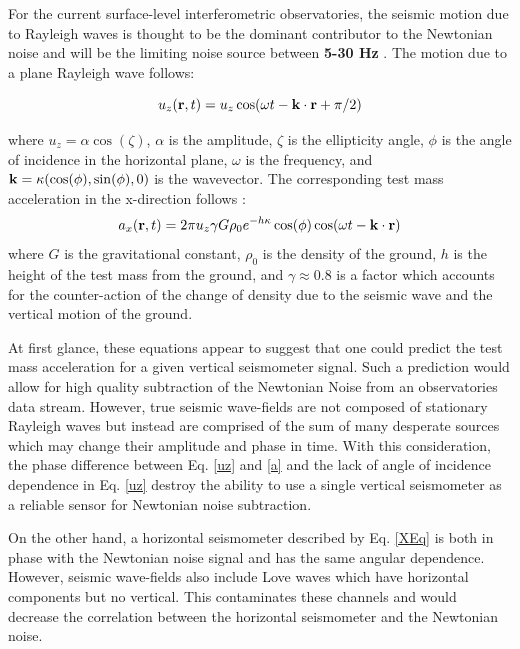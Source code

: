 \documentclass [12pt, proquest]{uwthesis}[2019]
\begin{document}
For the current surface-level interferometric observatories, the seismic motion due to Rayleigh waves is thought to be the dominant contributor to the Newtonian noise and will be the limiting noise source between \textbf{5-30 Hz} \cite{}. The motion due to a plane Rayleigh wave follows:

\begin{equation}
u_z({\bf r} ,t)=u_z \cos(\omega t-{\bf k}\cdot{\bf r}+\pi/2) \label{uz}
\end{equation}

where $u_z=\alpha \cos(\zeta)$, $\alpha$ is the amplitude, $\zeta$ is the ellipticity angle, $\phi$ is the angle of incidence in the horizontal plane, $\omega$ is the frequency, and $\bf{k}=\kappa (\cos(\phi),\sin(\phi),\text{0})$ is the wavevector. The corresponding test mass acceleration in the x-direction follows \cite{Harms_2016}:
\begin{equation}
a_x({\bf r} ,t)=2 \pi u_z \gamma G \rho_0 e^{-h \kappa}  \cos(\phi) \cos(\omega t-{\bf k}\cdot{\bf r}) \label{a}
\end{equation}
where $G$ is the gravitational constant, $\rho_0$ is the density of the ground, $h$ is the height of the test mass from the ground, and $\gamma \approx 0.8$ is a factor which accounts for the counter-action of the change of density due to the seismic wave and the vertical motion of the ground.

At first glance, these equations appear to suggest that one could predict the test mass acceleration for a given vertical seismometer signal. Such a prediction would allow for high quality subtraction of the Newtonian Noise from an observatories data stream. However, true seismic wave-fields are not composed of stationary Rayleigh waves but instead are comprised of the sum of many desperate sources which may change their amplitude and phase in time. With this consideration, the phase difference between Eq. \ref{uz} and \ref{a} and the lack of angle of incidence dependence in Eq. \ref{uz} destroy the ability to use a single vertical seismometer as a reliable sensor for Newtonian noise subtraction.

On the other hand, a horizontal seismometer described by Eq. \ref{XEq} is both in phase with the Newtonian noise signal and has the same angular dependence. However, seismic wave-fields also include Love waves which have horizontal components but no vertical. This contaminates these channels and would decrease the correlation between the horizontal seismometer and the Newtonian noise. 
\end{document}
